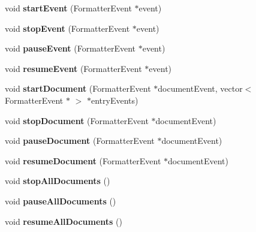 \begin{CompactItemize}
\item 
void \textbf{startEvent} (FormatterEvent $\ast$event)\label{classbr_1_1pucrio_1_1telemidia_1_1ginga_1_1ncl_1_1FormatterScheduler_9fad3d7096a88aa37d86ad1833920741}

\item 
void \textbf{stopEvent} (FormatterEvent $\ast$event)\label{classbr_1_1pucrio_1_1telemidia_1_1ginga_1_1ncl_1_1FormatterScheduler_2ea5a8b6d0184d2b7f5fb6149de8de06}

\item 
void \textbf{pauseEvent} (FormatterEvent $\ast$event)\label{classbr_1_1pucrio_1_1telemidia_1_1ginga_1_1ncl_1_1FormatterScheduler_d7e6c45d21b53a7f50b177f141874d26}

\item 
void \textbf{resumeEvent} (FormatterEvent $\ast$event)\label{classbr_1_1pucrio_1_1telemidia_1_1ginga_1_1ncl_1_1FormatterScheduler_5bd8af7291f1978754c40944c7d5059e}

\item 
void \textbf{startDocument} (FormatterEvent $\ast$documentEvent, vector$<$ FormatterEvent $\ast$ $>$ $\ast$entryEvents)\label{classbr_1_1pucrio_1_1telemidia_1_1ginga_1_1ncl_1_1FormatterScheduler_ae24d63a3d9926c6196e4441f08866c1}

\item 
void \textbf{stopDocument} (FormatterEvent $\ast$documentEvent)\label{classbr_1_1pucrio_1_1telemidia_1_1ginga_1_1ncl_1_1FormatterScheduler_830828333e3772d94169698b9908d470}

\item 
void \textbf{pauseDocument} (FormatterEvent $\ast$documentEvent)\label{classbr_1_1pucrio_1_1telemidia_1_1ginga_1_1ncl_1_1FormatterScheduler_e27cfdc1d4c312eeffbbc93830922139}

\item 
void \textbf{resumeDocument} (FormatterEvent $\ast$documentEvent)\label{classbr_1_1pucrio_1_1telemidia_1_1ginga_1_1ncl_1_1FormatterScheduler_7bf5f19558a490261d6192f3519f2002}

\item 
void \textbf{stopAllDocuments} ()\label{classbr_1_1pucrio_1_1telemidia_1_1ginga_1_1ncl_1_1FormatterScheduler_9e953d5d6d4127f31ac9f1f94c6e8718}

\item 
void \textbf{pauseAllDocuments} ()\label{classbr_1_1pucrio_1_1telemidia_1_1ginga_1_1ncl_1_1FormatterScheduler_c44094f08e7963fdbc0ac7d9af4bab70}

\item 
void \textbf{resumeAllDocuments} ()\label{classbr_1_1pucrio_1_1telemidia_1_1ginga_1_1ncl_1_1FormatterScheduler_6f35a7d1116ac7833ff1b0fce6441791}


\end{CompactItemize}
